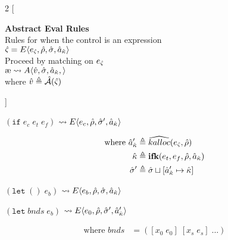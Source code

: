 \documentclass[12pt,draft]{article}
\newcommand\mae{\ensuremath{\text{\ae}}}
\newcommand{\ifsyn}[3]{(\texttt{if}\;#1\;#2\;#3)}
\newcommand{\E}[4]{E\langle #1 , #2 , #3 , #4 \rangle}
\newcommand{\A}[4]{A\langle #1 , #2 , #3 , #4 \rangle}
\begin{document}
\newpage

\newpage
\footnotesize{
\begin{multicols*}{2}
[
\begin{center}
\textbf{Abstract Eval Rules} \\
Rules for when the control is an expression \\
\vspace{2mm}
$\hat{\varsigma} = \E{\ectrl}{\aenv}{\astore}{\akaddr}$ \\
Proceed by matching on $e_{\hat{\varsigma}}$ \\
\vspace{2mm}
$\mae \leadsto \A{\aval}{\astore}{\akaddr}{}$ \\
where $\hat{v} \triangleq \hat{\mathcal{A}}(\hat{\varsigma})$
\end{center}
]
\begin{center}
  $ \ifsyn{e_c}{e_t}{e_f} $
  $\leadsto \E{e_c}{\aenv}{\astore'}{\akaddr}$
\end{center}
\vspace{-7mm}
\begin{align*}
  \text{where } \hat{a}_{\hat{\kappa}}' &\triangleq \widehat{kalloc}(e_{\hat{\varsigma}} , \hat{\rho}) \\
  \hat{\kappa} &\triangleq \textbf{ifk}(e_t, e_f, \hat{\rho} , \hat{a}_{\hat{\kappa}}) \\
  \hat{\sigma}' &\triangleq \hat{\sigma} \sqcup [\hat{a}_{\hat{\kappa}}' \mapsto \hat{\kappa}]
\end{align*}
\begin{center}
  $(\texttt{let}\;()\;e_b)$
  $\leadsto \E{e_b}{\aenv}{\astore}{\akaddr}$
\end{center}
\begin{center}
  $(\texttt{let}\;bnds\;e_b)$
  $\leadsto \E{e_0}{\aenv}{\astore'}{\akaddr'}$
\end{center}
\vspace{-7mm}
\begin{align*}
  \text{where }
  bnds &= ([x_0\;e_0]\;[x_s\;e_s]\;...) \\

\end{align*}
\end{multicols*}}
\end{document}
